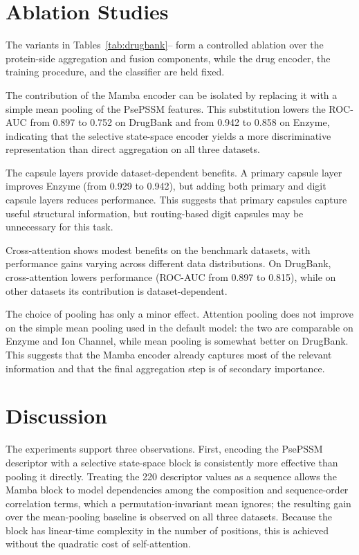 \documentclass[conference]{IEEEtran}
\begin{document}
\section{Ablation Studies}
The variants in Tables~\ref{tab:drugbank}-- form a controlled
ablation over the protein-side aggregation and fusion components, while the drug
encoder, the training procedure, and the classifier are held fixed.

The contribution of the Mamba encoder can be isolated by replacing it with a
simple mean pooling of the PsePSSM features. This substitution lowers the
ROC-AUC from 0.897 to 0.752 on DrugBank and from 0.942 to 0.858 on Enzyme, indicating that the selective state-space encoder
yields a more discriminative representation than direct aggregation on all three
datasets.

The capsule layers provide dataset-dependent benefits. A primary capsule layer
improves Enzyme (from 0.929 to 0.942), but adding both primary and digit capsule
layers reduces performance. This suggests that primary capsules capture useful
structural information, but routing-based digit capsules may be unnecessary for
this task.

Cross-attention shows modest benefits on the benchmark datasets, with performance gains varying across different data distributions. On DrugBank, cross-attention lowers performance (ROC-AUC from 0.897 to 0.815), while on other datasets its contribution is dataset-dependent.

The choice of pooling has only a minor effect. Attention pooling does not improve
on the simple mean pooling used in the default model: the two are comparable on
Enzyme and Ion Channel, while mean pooling is somewhat better on DrugBank. This
suggests that the Mamba encoder already captures most of the relevant
information and that the final aggregation step is of secondary importance.

\section{Discussion}
The experiments support three observations. First, encoding the PsePSSM
descriptor with a selective state-space block is consistently more effective than
pooling it directly. Treating the 220 descriptor values as a sequence allows the
Mamba block to model dependencies among the composition and sequence-order
correlation terms, which a permutation-invariant mean ignores; the resulting
gain over the mean-pooling baseline is observed on all three datasets. Because
the block has linear-time complexity in the number of positions, this is achieved
without the quadratic cost of self-attention.
\end{document}

